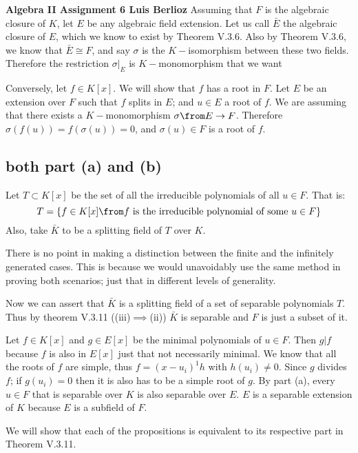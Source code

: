 \noindent\textbf{Algebra II Assignment 6 \hspace{\fill} Luis Berlioz}
Assuming that $F$ is the algebraic closure of $K$, let $E$ be any algebraic field extension.
Let us call $\bar E$ the algebraic closure of $E$, which we know to exist by Theorem V.3.6.
Also by  Theorem V.3.6, we know that $\bar E \cong F$, and say $\sigma$ is the $K-$isomorphism between these two fields.
Therefore the restriction $\sigma|_E$ is $K-$monomorphism that we want

Conversely, let $f\in K[x]$. We will show that $f$ has a root in $F$.
Let $E$ be an extension over $F$ such that $f$ splits in $E$; and $u\in E$ a root of $f$.
We are assuming that there exists a $K-$monomorphism $\sigma\from E\to F$.
Therefore $\sigma(f(u))=f(\sigma(u))=0$, and $\sigma(u)\in F$ is a root of $f$. 

\subsection*{both part (a) and (b)}
Let $T\subset K[x]$ be the set of all the irreducible polynomials of all $u\in F$. That is:
$$T=\{ f\in K[x] \from f \text{ is the irreducible polynomial of some } u\in F\}$$
Also, take $\bar K$ to be a splitting field of $T$ over $K$. 

There is no point in making a distinction between the finite and the infinitely generated cases. This is because we would unavoidably use the same method in proving both scenarios; just that in different levels of generality.

Now we can assert that $\bar K$ is a splitting field of a set of separable polynomials $T$.
Thus by theorem V.3.11 ((iii)$\implies $(ii)) $\bar K$ is separable and $F$ is just a subset of it.

Let $f\in K[x]$ and $g\in E[x]$ be the minimal polynomials of $u\in F$. Then $g|f$ because $f$ is also in $E[x]$ just that not necessarily minimal. We know that all the roots of $f$ are simple, thus $f= (x-u_i)^1h$ with $h(u_i)\neq 0$. Since $g$ divides $f$; if $g(u_i)=0$ then it is also has to be a simple root of $g$.
By part (a), every $u\in F$ that is separable over $K$ is also separable over $E$. 
$E$ is a separable extension of $K$ because $E$ is a subfield of $F$.

We will show that each of the propositions is equivalent to its respective part in  Theorem V.3.11.


